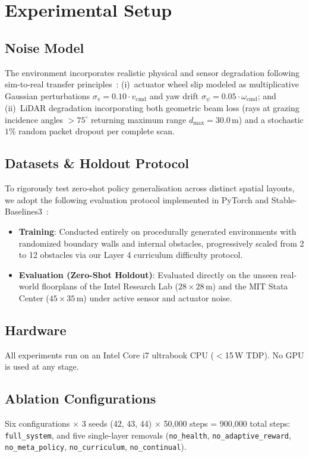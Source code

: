 \documentclass[conference]{IEEEtran}
\begin{document}
\section{Experimental Setup}

\subsection{Noise Model}
The environment incorporates realistic physical and sensor degradation following sim-to-real transfer principles~\cite{zhao2020}: (i)~actuator wheel slip modeled as multiplicative Gaussian perturbations $\sigma_v = 0.10 \cdot v_{\text{cmd}}$ and yaw drift $\sigma_\psi = 0.05 \cdot \omega_{\text{cmd}}$; and (ii)~LiDAR degradation incorporating both geometric beam loss (rays at grazing incidence angles $>75^\circ$ returning maximum range $d_{\max} = 30.0$\,m) and a stochastic $1\%$ random packet dropout per complete scan.

\subsection{Datasets \& Holdout Protocol}
To rigorously test zero-shot policy generalisation across distinct spatial layouts, we adopt the following evaluation protocol implemented in PyTorch and Stable-Baselines3~\cite{raffin2021}:
\begin{itemize}
    \item \textbf{Training}: Conducted entirely on procedurally generated environments with randomized boundary walls and internal obstacles, progressively scaled from 2 to 12 obstacles via our Layer 4 curriculum difficulty protocol.
    \item \textbf{Evaluation (Zero-Shot Holdout)}: Evaluated directly on the unseen real-world floorplans of the Intel Research Lab ($28\!\times\!28$\,m) and the MIT Stata Center ($45\!\times\!35$\,m) under active sensor and actuator noise.
\end{itemize}

\subsection{Hardware}
All experiments run on an Intel Core i7 ultrabook CPU ($<$15\,W TDP). No GPU is used at any stage.

\subsection{Ablation Configurations}
Six configurations $\times$ 3 seeds (42, 43, 44) $\times$ 50{,}000 steps = 900{,}000 total steps: \texttt{full\_system}, and five single-layer removals (\texttt{no\_health}, \texttt{no\_adaptive\_reward}, \texttt{no\_meta\_policy}, \texttt{no\_curriculum}, \texttt{no\_continual}).
\end{document}
